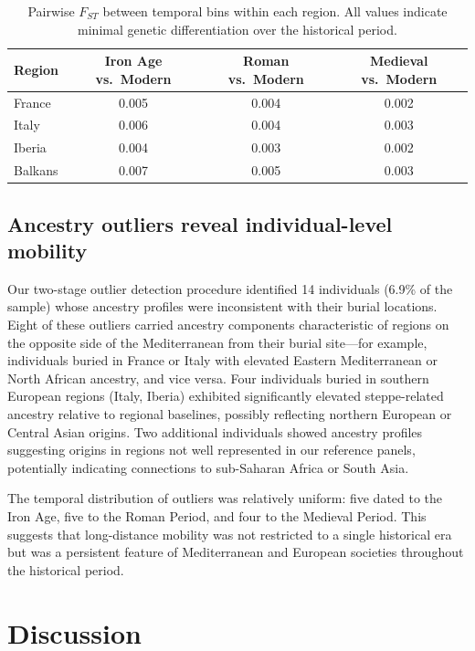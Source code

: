 \documentclass[11pt,a4paper]{article}
\begin{document}
\begin{table}[ht]
\centering
\caption{Pairwise $F_{ST}$ between temporal bins within each region. All values indicate minimal genetic differentiation over the historical period.}
\label{tab:fst}
\begin{tabular}{@{}lccc@{}}
\toprule
\textbf{Region} & \textbf{Iron Age vs.\ Modern} & \textbf{Roman vs.\ Modern} & \textbf{Medieval vs.\ Modern} \\
\midrule
France  & 0.005 & 0.004 & 0.002 \\
Italy   & 0.006 & 0.004 & 0.003 \\
Iberia  & 0.004 & 0.003 & 0.002 \\
Balkans & 0.007 & 0.005 & 0.003 \\
\bottomrule
\end{tabular}
\end{table}

\subsection{Ancestry outliers reveal individual-level mobility}
Our two-stage outlier detection procedure identified 14 individuals (6.9\% of the sample) whose ancestry profiles were inconsistent with their burial locations. Eight of these outliers carried ancestry components characteristic of regions on the opposite side of the Mediterranean from their burial site---for example, individuals buried in France or Italy with elevated Eastern Mediterranean or North African ancestry, and vice versa. Four individuals buried in southern European regions (Italy, Iberia) exhibited significantly elevated steppe-related ancestry relative to regional baselines, possibly reflecting northern European or Central Asian origins. Two additional individuals showed ancestry profiles suggesting origins in regions not well represented in our reference panels, potentially indicating connections to sub-Saharan Africa or South Asia.

The temporal distribution of outliers was relatively uniform: five dated to the Iron Age, five to the Roman Period, and four to the Medieval Period. This suggests that long-distance mobility was not restricted to a single historical era but was a persistent feature of Mediterranean and European societies throughout the historical period.

\section{Discussion}
\end{document}
